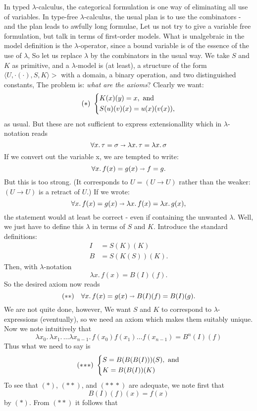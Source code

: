 \documentclass[12pt]{article}
\def\to{\rightarrow}
\def\imp{\shortrightarrow}
\def\l{\lambda}
\def\lm#1.#2{\lambda#1.\, #2}
\def\U{U}
\def\sss{(*\!*\!*)}
\def\ss{(**)}
\begin{document}
In typed $\l$-calculus, the categorical formulation is one way of eliminating all use of variables. In type-free $\l$-calculus, the usual plan is to use the combinators - and the plan leads to awfully long formulae, Let us not try to give a variable free formulation, but talk in terms of first-order models.
What is unalgebraic in the model definition is the $\l$-operator, since a bound variable is of the essence of the use of $\l$, So let us replace $\l$ by the combinators in the usual way. We take $S$ and $K$ as primitive, and a $\l$-model is (at least), a structure of the form $\langle U, \cdot(\cdot), S, K\rangle>$ with a domain, a binary operation, and two distinguished constants, The problem is: {\it what are the axioms}? Clearly we want:
%
\[
(*) \,\,
\begin{dcases}
K(x)(y) = x, {\textrm { and}}\\
S(u)(v)(x) = u(x)(v(x)),
\end{dcases}
\]
%
as usual. But these are not sufficient to express extensionallity which in $\l$-notation reads
$$
\forall x.\, \tau = \sigma \imp \lm{x}. \tau = \lm{x}. \sigma
$$
If we convert out the variable x, we are tempted to write:
$$
\forall x.\, f(x) = g(x) \imp f = g.
$$
But this is too strong. (It corresponds to $\U = (\U \to \U)$ rather than the weaker: $(\U \to \U)$ is a retract of $\U$.) If we wrote:
$$
\forall x.\, f(x) = g(x) \imp \lm{x}.f(x) = \lm{x}.g(x),
$$
the statement would at least be correct - even if containing the unwanted $\l$. Well, we just have to define this $\l$ in terms of $S$ and $K$. Introduce the standard definitions:
\begin{align*}
I &= S(K)(K)\\
B &= S(K(S))(K).
\end{align*}
%
Then, with $\l$-notation
$$
\lm{x}.f(x) = B(I)(f).
$$
So the desired axiom now reads
$$
({\mathrm {**}}) \quad \forall x.\, f(x) = g(x) \imp B(I)(f) = B(I)(g).
$$
We are not quite done, however, We want $S$ and $K$ to correspond to $\l$-expressions (eventually), so we need an axiom which makes them suitably unique. Now we note intuitively that
$$
\lm{x_0}. \lm{x_1}. \dots \lm{x_{n-1}}. f(x_0)f(x_1)\dots f(x_{n-1}) = B^n(I)(f)
$$
Thus what we need to say is
\[
\sss \,\,
\begin{dcases}
S = B(B(B(I)))(S), {\textrm { and}}\\
K = B(B(I))(K)
\end{dcases}
\]
To see that $(*)$, $\ss$, and $\sss$ are adequate, we note first that
$$
B(I)(f)(x) = f(x)
$$
by $(*)$. From $\ss$ it follows that
\end{document}
